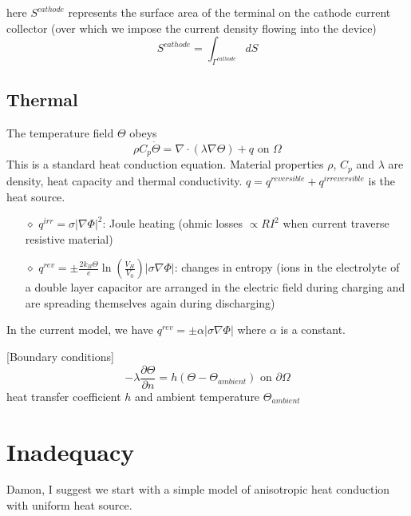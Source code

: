 \documentclass[10pt, oneside]{article}   	%
\begin{document}
here $S^{cathode}$ represents the surface area of the terminal on the cathode
current collector (over which we impose the current density flowing into the
device)
\begin{equation}
S^{cathode} = \int_{\Gamma^{cathode}} dS
\end{equation}

\subsection{Thermal}

The temperature field $\Theta$ obeys
\begin{equation}
\rho C_p \dot{\Theta} = \nabla \cdot (\lambda \nabla \Theta) + q \text{ on } \Omega
\label{eq:heat_conduction}
\end{equation}
This is a standard heat conduction equation.
Material properties $\rho$, $C_p$ and $\lambda$ are density, heat capacity and
thermal conductivity.
$q=q^{reversible}+q^{irreversible}$ is the heat source.
\begin{itemize}
\item[$\diamond$] $q^{irr} = \sigma | \nabla \Phi |^2$: Joule heating (ohmic
losses $\propto R I^2$ when current traverse resistive material)

\item[$\diamond$] $q^{rev} = \pm \frac{2 k_B \Theta}{e} \ln(\frac{V_H}{V_0}) |
\sigma \nabla \Phi |$: changes in entropy (ions in the electrolyte of a double
layer capacitor are arranged in the electric field during charging and are
spreading themselves again during discharging)
\end{itemize}

In the current model, we have $q^{rev} = \pm \alpha |\sigma \nabla\Phi|$ where
$\alpha$ is a constant.

[Boundary conditions]
\begin{equation}
- \lambda \frac{\partial \Theta}{\partial n} = h (\Theta - \Theta_{ambient}) \text{ on } \partial\Omega
\end{equation}
heat transfer coefficient $h$ and ambient temperature $\Theta_{ambient}$

\newpage
\section{Inadequacy}
Damon, I suggest we start with a simple model of anisotropic heat conduction
with uniform heat source.
\end{document}
